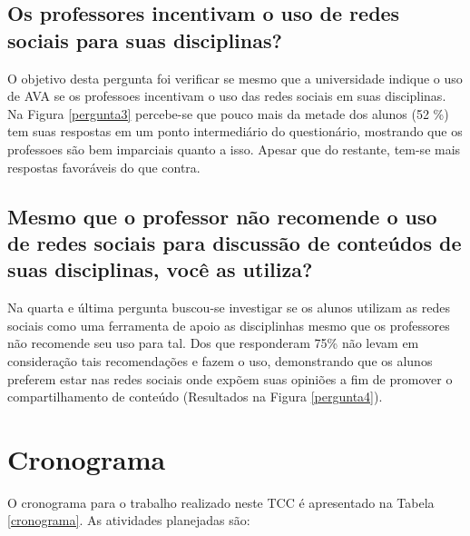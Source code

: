 \subsection*{Os professores incentivam o uso de redes sociais para suas disciplinas?}

O objetivo desta pergunta foi verificar se mesmo que a universidade indique o uso de AVA se os professoes incentivam o uso das redes sociais em suas disciplinas. Na Figura \ref{pergunta3} percebe-se que pouco mais da metade dos alunos (52 \%) tem suas respostas em um ponto intermediário do questionário, mostrando que os professoes são bem imparciais quanto a isso. Apesar que do restante, tem-se mais respostas favoráveis do que contra.

\subsection*{Mesmo que o professor não recomende o uso de redes sociais para discussão de conteúdos de suas disciplinas, você as utiliza?}

Na quarta e última pergunta buscou-se investigar se os alunos utilizam as redes sociais como uma ferramenta de apoio as disciplinhas mesmo que os professores não recomende seu uso para tal. Dos que responderam 75\% não levam em consideração tais recomendações e fazem o uso, demonstrando que os alunos preferem estar nas redes sociais onde expõem suas opiniões a fim de promover o compartilhamento de conteúdo (Resultados na Figura \ref{pergunta4}).

\section{Cronograma}

O cronograma para o trabalho realizado neste TCC é apresentado na Tabela \ref{cronograma}. As atividades planejadas são:

